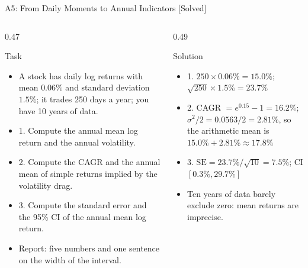 \begin{frame}{A5: From Daily Moments to Annual Indicators [Solved]}
\itemsize{\footnotesize}
\begin{columns}[T]
\begin{column}{0.47\textwidth}
\begin{block}{Task}
\begin{itemize}
    \item A stock has daily log returns with mean $0.06\%$ and standard deviation $1.5\%$; it trades 250 days a year; you have 10 years of data.
    \item 1. Compute the annual mean log return and the annual volatility.
    \item 2. Compute the CAGR and the annual mean of simple returns implied by the volatility drag.
    \item 3. Compute the standard error and the 95\% CI of the annual mean log return.
    \item Report: five numbers and one sentence on the width of the interval.
\end{itemize}
\end{block}
\end{column}
\begin{column}{0.49\textwidth}
\begin{exampleblock}{Solution}
\begin{itemize}
    \item 1. $250 \times 0.06\% = 15.0\%$; $\sqrt{250} \times 1.5\% = 23.7\%$
    \item 2. CAGR $= e^{0.15} - 1 = 16.2\%$; $\sigma^2/2 = 0.0563/2 = 2.81\%$, so the arithmetic mean is $15.0\% + 2.81\% \approx 17.8\%$
    \item 3. $\text{SE} = 23.7\%/\sqrt{10} = 7.5\%$; CI $[0.3\%, 29.7\%]$
    \item Ten years of data barely exclude zero: mean returns are imprecise.
\end{itemize}
\end{exampleblock}
\end{column}
\end{columns}
\end{frame}

